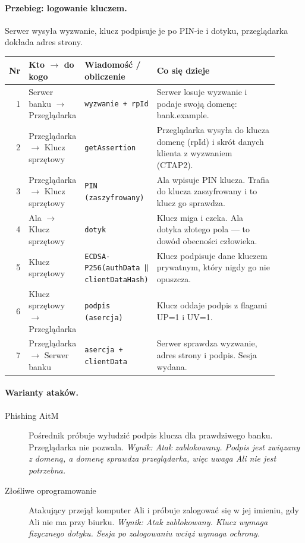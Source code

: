 \paragraph{Przebieg: logowanie kluczem.} Serwer wysyła wyzwanie, klucz podpisuje je po PIN-ie i dotyku, przeglądarka dokłada adres strony.
\begingroup\footnotesize
\begin{longtable}{@{}r p{0.2\linewidth} p{0.24\linewidth} p{0.46\linewidth}@{}}
\toprule
Nr & Kto $\rightarrow$ do kogo & Wiadomość / obliczenie & Co się dzieje \\
\midrule
\endhead
1 & Serwer banku $\rightarrow$ Przeglądarka & \texttt{wyzwanie + rpId} & Serwer losuje wyzwanie i podaje swoją domenę: bank.example. \\
2 & Przeglądarka $\rightarrow$ Klucz sprzętowy & \texttt{getAssertion} & Przeglądarka wysyła do klucza domenę (rpId) i skrót danych klienta z wyzwaniem (CTAP2). \\
3 & Przeglądarka $\rightarrow$ Klucz sprzętowy & \texttt{PIN (zaszyfrowany)} & Ala wpisuje PIN klucza. Trafia do klucza zaszyfrowany i to klucz go sprawdza. \\
4 & Ala $\rightarrow$ Klucz sprzętowy & \texttt{dotyk} & Klucz miga i czeka. Ala dotyka złotego pola — to dowód obecności człowieka. \\
5 & Klucz sprzętowy & \texttt{ECDSA-P256(authData ‖ clientDataHash)} & Klucz podpisuje dane kluczem prywatnym, który nigdy go nie opuszcza. \\
6 & Klucz sprzętowy $\rightarrow$ Przeglądarka & \texttt{podpis (asercja)} & Klucz oddaje podpis z flagami UP=1 i UV=1. \\
7 & Przeglądarka $\rightarrow$ Serwer banku & \texttt{asercja + clientData} & Serwer sprawdza wyzwanie, adres strony i podpis. Sesja wydana. \\
\bottomrule
\end{longtable}
\endgroup

\paragraph{Warianty ataków.}
\begin{description}
\item[Phishing AitM] Pośrednik próbuje wyłudzić podpis klucza dla prawdziwego banku. Przeglądarka nie pozwala. \emph{Wynik: Atak zablokowany. Podpis jest związany z domeną, a domenę sprawdza przeglądarka, więc uwaga Ali nie jest potrzebna.}
\item[Złośliwe oprogramowanie] Atakujący przejął komputer Ali i próbuje zalogować się w jej imieniu, gdy Ali nie ma przy biurku. \emph{Wynik: Atak zablokowany. Klucz wymaga fizycznego dotyku. Sesja po zalogowaniu wciąż wymaga ochrony.}
\end{description}

